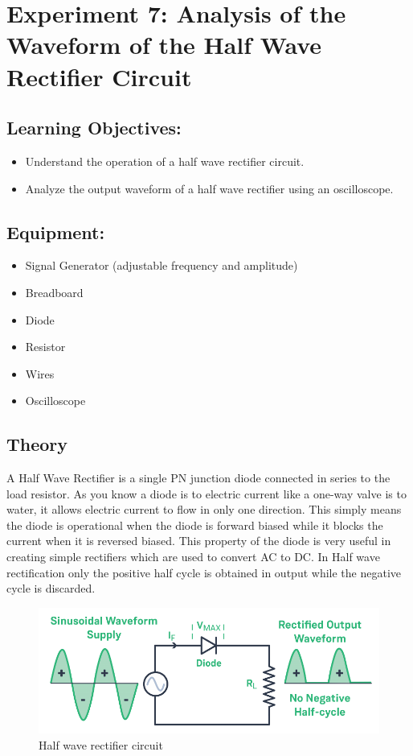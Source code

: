 \section*{Experiment 7: Analysis of the Waveform of the Half Wave Rectifier Circuit}  

\subsection*{Learning Objectives:}
\begin{itemize}
    \item Understand the operation of a half wave rectifier circuit.
    \item Analyze the output waveform of a half wave rectifier using an oscilloscope.
\end{itemize}

\subsection*{Equipment:}
\begin{itemize}
    \item Signal Generator (adjustable frequency and amplitude)
    \item Breadboard
    \item Diode
    \item Resistor
    \item Wires
    \item Oscilloscope
\end{itemize}

\subsection*{Theory}

A Half Wave Rectifier is a single PN junction diode connected in series to the load resistor. As you know a diode is to electric current like a one-way valve is to water, it allows electric current to flow in only one direction. This simply means the diode is operational when the diode is forward biased while it blocks the current when it is reversed biased. This property of the diode is very useful in creating simple rectifiers which are used to convert AC to DC. In Half wave rectification only the positive half cycle is obtained in output while the negative cycle is discarded.

\begin{figure}[H]
    \centering
    \includegraphics[width=0.75\linewidth]{img/rectifier.png}
    \caption{Half wave rectifier circuit}
    \label{fig:enter-label}
\end{figure}

